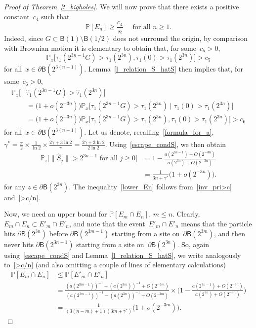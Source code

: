 \documentclass[AHL,Unicode,longabstracts]{cedram}
\newcommand{\1}[1]{{\mathbf 1}{\{#1\}}}
\newcommand{\s}{{\widehat S}}
\newcommand{\8}{{\infty}}
\newcommand{\IP}{{\mathbb P}}
\newcommand{\htau}{\widehat{\tau}}
\newcommand{\B}{{\mathsf B}}
\begin{document}
\begin{proof}[Proof of Theorem~\ref{t_bigholes}]
We will now prove that there exists a positive constant~$c_4$ such that
\begin{equation}\label{lower_En}
\IP[E_n] \geq \frac{c_4}{n} \quad \text{ for all }n\geq 1.
\end{equation}
Indeed, since $G\subset\B(1)\setminus \B(1/2)$ does not surround the origin, by comparison with Brownian motion it is elementary to obtain that, for some~$c_5>0$,
\[
\IP_x\big[\tau_1(2^{3n-1}G)>\tau_1(2^{3n}),
\tau_1(0)>\tau_1(2^{3n}) \big] > c_5
\]
for all~$x\in\partial \B(2^{3(n-1)})$. Lemma~\ref{l_relation_S_hatS} then implies that, for some~$c_6>0$,
\begin{align}
\IP_x\big[&\htau_1(2^{3n-1}G)>\htau_1(2^{3n})\big]\nonumber\\
&= \big(1+o(2^{-3n})\big)
\IP_x\big[\tau_1(2^{3n-1}G)>\tau_1(2^{3n})
\mid \tau_1(0)>\tau_1(2^{3n})\big] \nonumber\\
&= \big(1+o(2^{-3n})\big)
\IP_x\big[\tau_1(2^{3n-1}G)>\tau_1(2^{3n}),
\tau_1(0)>\tau_1(2^{3n})\big] > c_6\label{inv_pri>c}
\end{align}
for all~$x\in\partial \B(2^{3(n-1)})$. Let us denote, recalling~\eqref{formula_for_a}, $\gamma^{*}=\frac{\pi}{2}\times\frac{1}{\ln 2} \times
\frac{2\gamma+ 3\ln 2}{\pi} =\frac{2\gamma+ 3\ln 2}{2\ln 2}$. Using~\eqref{escape_condS}, we then obtain
\begin{align}
\IP_z\big[\|\s_j\| > 2^{3n-1} \text{ for all } j\geq 0\big] & = 1- \frac{a(2^{3n-1})+O(2^{-3n})}{a(2^{3n})+O(2^{-3n})}
\nonumber\\
&= \frac{1}{3n+\gamma^{*}}\big(1+o(2^{-3n})\big).\label{>c/n}
\end{align}
for any $z\in\partial \B(2^{3n})$. The inequality~\eqref{lower_En} follows from~\eqref{inv_pri>c} and~\eqref{>c/n}.

Now, we need an upper bound for $\IP[E_m\cap E_n]$, $m\leq n$. Clearly, $E_m \cap E_n\subset E'_m \cap E'_n$, and note that the event~$E'_m \cap E'_n$ means that the particle hits $\partial\B(2^{3n})$ before $\partial\B(2^{3m-1})$ starting from a site on~$\partial\B(2^{3m})$, and then never hits $\partial\B(2^{3n-1})$ starting from a site on~$\partial\B(2^{3n})$. So, again using~\eqref{escape_condS} and Lemma~\ref{l_relation_S_hatS}, we write analogously to~\eqref{>c/n} (and also omitting a couple of lines of elementary calculations)
\begin{align}
\IP[E_m \cap E_n] & \leq \IP[E'_m \cap E'_n]\nonumber\\
& = \frac{(a(2^{3m-1}))^{-1}-(a(2^{3m}))^{-1}+O(2^{-3m})} {(a(2^{3m-1}))^{-1}-(a(2^{3n}))^{-1}+O(2^{-3m})}
\times \Big(1- \frac{a(2^{3n-1})+O(2^{-3n})}{a(2^{3n})+O(2^{-3n})}\Big)
\nonumber\\
& = \frac{1}{(3(n-m)+1)(3m+\gamma^{*})}\big(1+o(2^{-3m})\big).\label{EmEn_upper}
\end{align}


\end{proof}
\end{document}
